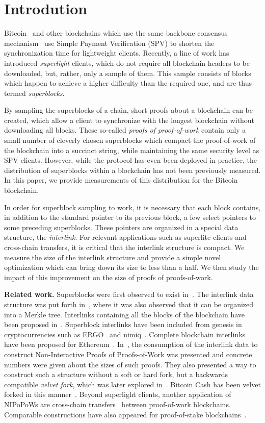 \section{Introdution}

Bitcoin~\cite{bitcoin} and other blockchains which use the same backbone
consensus mechanism~\cite{EC:GarKiaLeo15} use Simple Payment Verification (SPV)
to shorten the synchronization time for lightweight clients. Recently, a
line of work has introduced \emph{superlight} clients, which do not require all
blockchain headers to be downloaded, but, rather, only a sample of them. This
sample consists of blocks which happen to achieve a higher difficulty than the
required one, and are thus termed \emph{superblocks}.

By sampling the superblocks of a chain, short proofs about a blockchain can be
created, which allow a client to synchronize with the longest blockchain without
downloading all blocks. These so-called \emph{proofs of proof-of-work} contain
only a small number of cleverly chosen superblocks which compact the
proof-of-work of the blockchain into a succinct string, while maintaining the
same security level as SPV clients. However, while the protocol has even been deployed in
practice, the distribution of superblocks within a blockchain has not been
previously measured. In this paper, we provide measurements of this distribution for the
Bitcoin blockchain.

In order for superblock sampling to work, it is necessary that each block
contains, in addition to the standard pointer to its previous block, a few
select pointers to some preceding superblocks. These pointers are organized in a
special data structure, the \emph{interlink}. For relevant applications such as
superlite clients and cross-chain transfers, it is critical that the interlink
structure is compact. We measure the size of the interlink structure and provide
a simple novel optimization which can bring down its size to less than a
half. We then study the impact of this improvement on the size of proofs of
proofs-of-work.

\noindent
\textbf{Related work.}
Superblocks were first observed to exist in~\cite{highway}.
The interlink data structure was put forth in~\cite{popow}, where it was also
observed that it can be organized into a Merkle tree. Interlinks containing all
the blocks of the blockchain have been
proposed in~\cite{flyclient}. Superblock interlinks have
been included from genesis in cryptocurrencies such as ERGO~\cite{ergo} and
nimiq~\cite{nimiq}. Complete blockchain interlinks have been proposed for Ethereum~\cite{eip210}. In~\cite{nipopows}, the consumption of the interlink data to
construct Non-Interactive Proofs of Proofs-of-Work was presented and concrete
numbers were given about the sizes of such proofs. They also presented a way to
construct such a structure without a soft or hard fork, but a backwards
compatible \emph{velvet fork}, which was later explored in~\cite{velvet}.
Bitcoin Cash has been velvet forked in this manner~\cite{gtklocker}. Beyond
superlight clients, another
application of NIPoPoWs are cross-chain transfers~\cite{pow-sidechains}
between proof-of-work blockchains. Comparable
constructions have also appeared for proof-of-stake
blockchains~\cite{pos-sidechains}.

